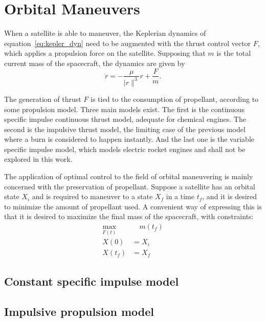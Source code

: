 
\section{Orbital Maneuvers}

When a satellite is able to maneuver, the Keplerian dynamics of equation~\eqref{eq:kepler_dyn} need to be augmented with the thrust control vector \(F\), which applies a propulsion force on the satellite. Supposing that \(m\) is the total current mass of the spacecraft, the dynamics are given by
\begin{equation}
    \ddot r = -\frac{\mu}{\lvert r \rVert^3}r + \frac{F}{m}.
\end{equation}

The generation of thrust \(F\) is tied to the consumption of propellant, according to some propulsion model. Three main models exist. The first is the continuous specific impulse continuous thrust model, adequate for chemical engines. The second is the impulsive thrust model, the limiting case of the previous model where a burn is considered to happen instantly. And the last one is the variable specific impulse model, which models electric rocket engines and shall not be explored in this work.

The application of optimal control to the field of orbital maneuvering is mainly concerned with the preservation of propellant. Suppose a satellite has an orbital state \(X_i\) and is required to maneuver to a state \(X_f\) in a time \(t_f\), and it is desired to minimize the amount of propellant used. A convenient way of expressing this is that it is desired to maximize the final mass of the spacecraft, with constraints:
\begin{align}
    \max_{F(t)}&\quad m(t_f) \label{eq:max_final_mass} \\
    X(0) &= X_i \\
    X(t_f) &= X_f
\end{align}

\subsection{Constant specific impulse model}



\subsection{Impulsive propulsion model}

